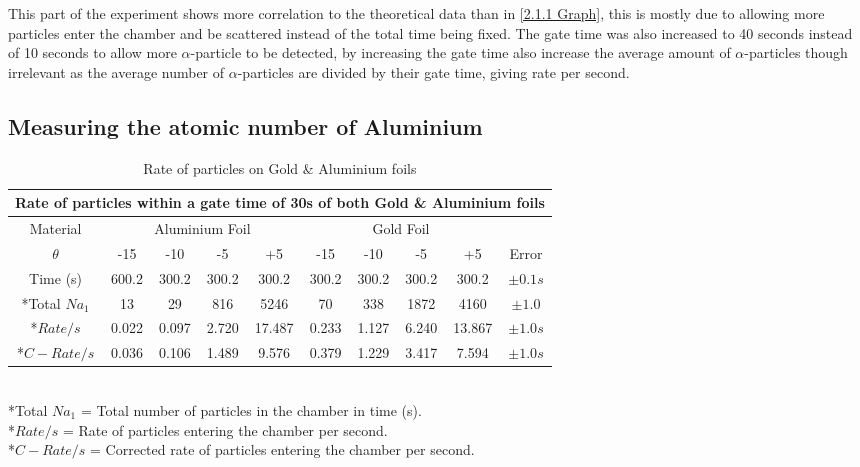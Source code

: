 \documentclass[12pt]{article}
\begin{document}
This part of the experiment shows more correlation to the theoretical data than in \cref{2.1.1 Graph}, this is mostly due to allowing more particles enter the chamber and be scattered instead of the total time being fixed. The gate time was also increased to 40 seconds instead of 10 seconds to allow more $\alpha$-particle to be detected, by increasing the gate time also increase the average amount of $\alpha$-particles though irrelevant as the average number of $\alpha$-particles are divided by their gate time, giving rate per second. \\

\subsection{Measuring the atomic number of Aluminium}
\label{Measuring the atomic number of Aluminium Findings}

\begin{table}[H]
\begin{center}
 \footnotesize
 \begin{tabular}{|c||c|c|c|c||c|c|c|c||c|}
 \hline
 \multicolumn{10}{|c|}{Rate of particles within a gate time of 30s of both Gold \& Aluminium foils} \\
 \hline \hline
 Material & \multicolumn{4}{c||}{Aluminium Foil} & \multicolumn{4}{c||}{Gold Foil} & \multicolumn{1}{|c|}{} \\
 \hline 
 $\theta$ & -15 & -10 & -5 & +5 & -15 & -10 & -5 & +5 & Error \\
 \hline
 \hline
 Time (s) & 600.2 & 300.2 & 300.2 & 300.2 & 300.2 & 300.2 & 300.2 & 300.2 & $\pm0.1s$ \\
 \hline
 *Total $Na_1$ & 13 & 29 & 816 & 5246 & 70 & 338 & 1872 & 4160 & $\pm1.0$ \\
 \hline
 *$Rate/s$ & 0.022 & 0.097 & 2.720 & 17.487 & 0.233 & 1.127 & 6.240 & 13.867 & $\pm1.0s$ \\
 \hline \hline
 *$C-Rate/s$ & 0.036 & 0.106 & 1.489 & 9.576 & 0.379 & 1.229 & 3.417 & 7.594 & $\pm1.0s$ \\
 \hline
 \end{tabular} \\ [0.2cm]
 *Total $Na_1$ = Total number of particles in the chamber in time (s). \\
 *$Rate/s$ = Rate of particles entering the chamber per second. \\
 *$C-Rate/s$ = Corrected rate of particles entering the chamber per second.
 \caption{Rate of particles on Gold \& Aluminium foils}
 \label{2.2 Results}
\end{center}
\end{table}
\end{document}
